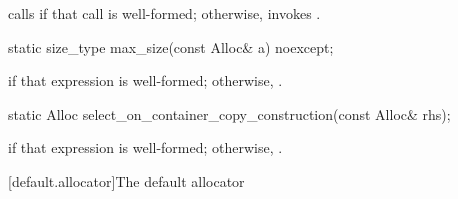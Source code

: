 \begin{itemdescr}
\pnum
\effects calls  if that call is well-formed; otherwise, invokes
.
\end{itemdescr}

%
%
\begin{itemdecl}
static size_type max_size(const Alloc& a) noexcept;
\end{itemdecl}

\begin{itemdescr}
\pnum
\returns {} if that expression is well-formed; otherwise,
.
\end{itemdescr}

%
%
\begin{itemdecl}
static Alloc select_on_container_copy_construction(const Alloc& rhs);
\end{itemdecl}

\begin{itemdescr}
\pnum
\returns {} if that expression is
well-formed; otherwise, .
\end{itemdescr}

[default.allocator]{The default allocator}


